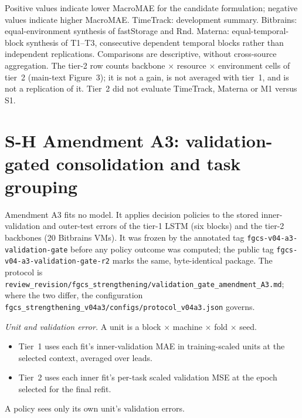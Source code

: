 \documentclass[a4paper,11pt]{article}
\begin{document}
\begin{table}[t]
  \vspace{2pt}
  \parbox{\textwidth}{\footnotesize
    Positive values indicate lower MacroMAE for the candidate formulation;
    negative values indicate higher MacroMAE. TimeTrack: development summary.
    Bitbrains: equal-environment synthesis of fastStorage and Rnd.
    Materna: equal-temporal-block synthesis of T1--T3, consecutive dependent
    temporal blocks rather than independent replications. Comparisons are
    descriptive, without cross-source aggregation. The tier-2 row counts
    backbone $\times$ resource $\times$ environment cells of tier~2
    (main-text Figure~3); it is not a gain,
    is not averaged with tier~1, and is not a replication of it. Tier~2 did
    not evaluate TimeTrack, Materna or M1 versus S1.}
\end{table}

\clearpage
\section*{S-H Amendment A3: validation-gated consolidation and task grouping}
\label{sec:s-h}
Amendment A3 fits no model. It applies decision policies to the stored inner-validation and outer-test errors of
the tier-1 LSTM (six blocks) and the tier-2 backbones (20 Bitbrains VMs). It was frozen by the annotated tag
\texttt{fgcs-v04-a3-validation-gate} before any policy outcome was computed; the public tag
\texttt{fgcs-v04-a3-validation-gate-r2} marks the same, byte-identical package. The protocol is
\texttt{review\_revision/fgcs\_strengthening/validation\_gate\_amendment\_A3.md}; where the two differ, the
configuration \texttt{fgcs\_strengthening\_v04a3/configs/protocol\_v04a3.json} governs.

\emph{Unit and validation error.} A unit is a block $\times$ machine $\times$ fold $\times$ seed.
\begin{itemize}
  \item Tier~1 uses each fit's inner-validation MAE in training-scaled units at the selected context, averaged
    over leads.
  \item Tier~2 uses each inner fit's per-task scaled validation MSE at the epoch selected for the final refit.
\end{itemize}
A policy sees only its own unit's validation errors.
\end{document}
